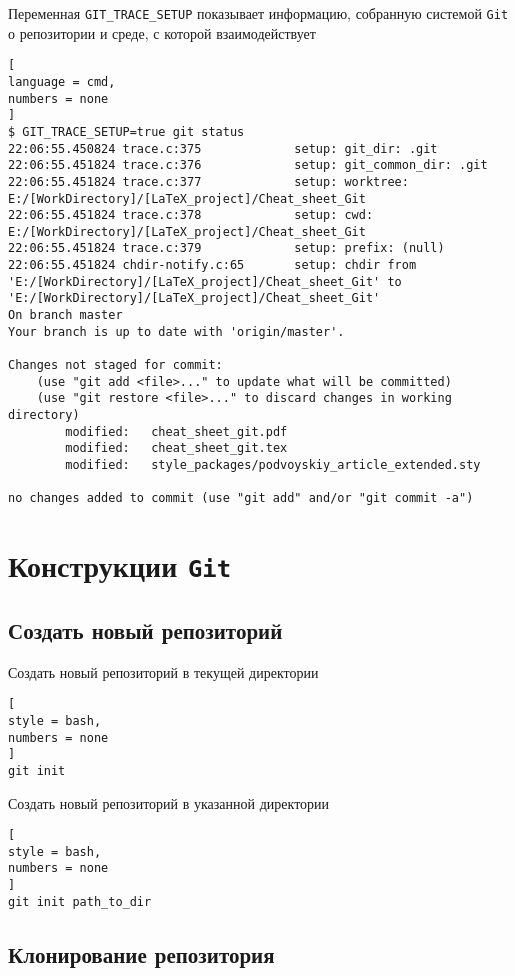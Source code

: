 \documentclass[%
	11pt,
	a4paper,
	utf8,
		]{article}
\begin{document}
Переменная \verb|GIT_TRACE_SETUP| показывает информацию, собранную системой \texttt{Git} о репозитории и среде, с которой взаимодействует
\begin{lstlisting}[
language = cmd,
numbers = none
]
$ GIT_TRACE_SETUP=true git status
22:06:55.450824 trace.c:375             setup: git_dir: .git
22:06:55.451824 trace.c:376             setup: git_common_dir: .git
22:06:55.451824 trace.c:377             setup: worktree: E:/[WorkDirectory]/[LaTeX_project]/Cheat_sheet_Git
22:06:55.451824 trace.c:378             setup: cwd: E:/[WorkDirectory]/[LaTeX_project]/Cheat_sheet_Git
22:06:55.451824 trace.c:379             setup: prefix: (null)
22:06:55.451824 chdir-notify.c:65       setup: chdir from 'E:/[WorkDirectory]/[LaTeX_project]/Cheat_sheet_Git' to 'E:/[WorkDirectory]/[LaTeX_project]/Cheat_sheet_Git'
On branch master
Your branch is up to date with 'origin/master'.

Changes not staged for commit:
    (use "git add <file>..." to update what will be committed)
    (use "git restore <file>..." to discard changes in working directory)
        modified:   cheat_sheet_git.pdf
        modified:   cheat_sheet_git.tex
        modified:   style_packages/podvoyskiy_article_extended.sty

no changes added to commit (use "git add" and/or "git commit -a")
\end{lstlisting}


\section{Конструкции \texttt{Git}}

\subsection{Создать новый репозиторий}

Создать новый репозиторий в текущей директории
\begin{lstlisting}[
style = bash,
numbers = none
]
git init
\end{lstlisting}

Создать новый репозиторий в указанной директории
\begin{lstlisting}[
style = bash,
numbers = none
]
git init path_to_dir
\end{lstlisting}

\subsection{Клонирование репозитория}
\end{document}
